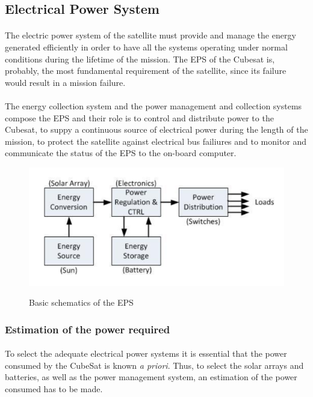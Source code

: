 \subsection{Electrical Power System}

\paragraph{}The electric power system of the satellite must provide and manage the energy generated efficiently in order to have all the systems operating under normal conditions during the lifetime of the mission. The EPS of the Cubesat is, probably, the most fundamental requirement of the satellite, since its failure would result in a mission failure. 

\paragraph{}The energy collection system and the power management and  collection systems compose the EPS and their role is to control and distribute power to the Cubesat, to suppy a continuous source of electrical power during the length of the mission, to protect the satellite against electrical bus failiures and to monitor and communicate the status of the EPS to the on-board computer.

\begin{figure}[h]
\includegraphics[scale=0.6]{./sections/SatelliteDesign/images/epsbasics}
\centering
\caption{Basic schematics of the EPS} 
\cite{epsbasics}
\end{figure}

\subsubsection{Estimation of the power required}
\paragraph{}To select the adequate electrical power systems it is essential that the power consumed by the CubeSat is known \textit{a priori}. Thus, to select the solar arrays and batteries, as well as the power management system, an estimation of the power consumed has to be made.

